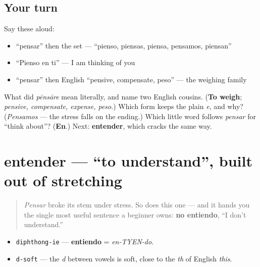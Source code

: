 \subsection*{Your turn}
Say these aloud:

\begin{itemize}
\raggedright
  \item \textquotedblleft{}pensar\textquotedblright{} then the set — \textquotedblleft{}pienso, piensas, piensa, pensamos, piensan\textquotedblright{}
  \item \textquotedblleft{}Pienso en ti\textquotedblright{} — I am thinking of you
  \item \textquotedblleft{}pensar\textquotedblright{} then English \textquotedblleft{}pensive, compensate, peso\textquotedblright{} — the weighing family
\end{itemize}

\begin{tcolorbox}[breakable,colback=teal!4,colframe=teal!35!black,title={Before you move on}]
What did \emph{pēnsāre} mean literally, and name two English cousins. (\textbf{To weigh}; \emph{pensive, compensate, expense, peso}.) Which form keeps the plain \emph{e}, and why? (\emph{Pensamos} — the stress falls on the ending.) Which little word follows \emph{pensar} for \textquotedblleft{}think about\textquotedblright{}? (\textbf{En}.) Next: \textbf{entender}, which cracks the same way.
\end{tcolorbox}
\section[entender]{entender — \textquotedblleft{}to understand\textquotedblright{}, built out of stretching}

\label{lesson:ES-C34-entender}



\begin{quote}
\emph{Pensar} broke its stem under stress. So does this one — and it hands you the single most useful sentence a beginner owns: \textbf{no entiendo}, \textquotedblleft{}I don't understand.\textquotedblright{}
\end{quote}

\begin{sounds}
\begin{itemize}
\raggedright
  \item \texttt{diphthong-ie} — \textbf{entiendo} = \emph{en-TYEN-do}.
  \item \texttt{d-soft} — the \emph{d} between vowels is soft, close to the \emph{th} of English \emph{this}.
\end{itemize}
\end{sounds}

